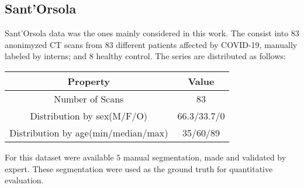 \documentclass{standalone}
\begin{document}
	\subsection{Sant'Orsola}
	
	Sant'Orsola data was the ones mainly considered in this work. The consist into 83 anonimyzed CT scans from $83$ different patients affected by COVID-19, manually labeled by interns; and $8$ healthy control.
	The series are distributed as follows: 
	\begin{table}[h!]
		\centering
		\begin{tabular}{|c|c|}
			\hline
					\textbf{Property}   		&	\textbf{Value} \\ \hline
					Number of Scans 			& 83			   \\ 
			Distribution by sex(M/F/O)  		& 66.3/33.7/0    \\
			Distribution by age(min/median/max) & 35/60/89	\\ \hline
		\end{tabular}
	\end{table}

	For this dataset were available $5$ manual segmentation, made and validated by expert. These segmentation were used as the ground truth for quantitative evaluation.
	
\end{document}
